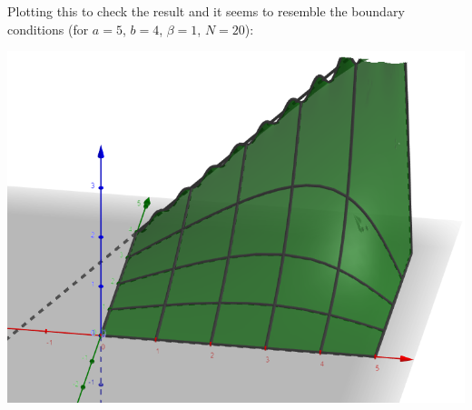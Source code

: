 \documentclass{homework}
\begin{document}
\begin{enumerate}
\begin{enumerate}
			\pagebreak
			Plotting this to check the result and it seems to resemble the boundary conditions (for $a=5$, $b=4$, $\beta=1$, $N=20$):
			\begin{center}
				\includegraphics[width=0.7\linewidth]{hw6_3}
			\end{center}
			
		\end{enumerate}
	

\end{enumerate}
\end{document}
